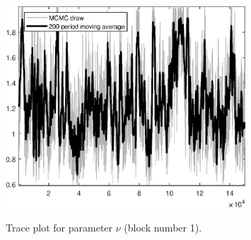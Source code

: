 \begin{figure}[H]
\centering
  \includegraphics[width=0.8\textwidth]{BRS_gen/graphs/TracePlot_nu_blck_1}\\
    \caption{Trace plot for parameter $\nu$ (block number 1).}
\end{figure}
